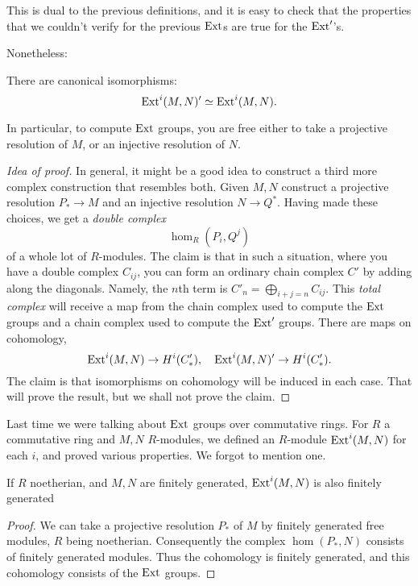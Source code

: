 This is dual to the previous definitions, and it is easy to
check that the
properties that we couldn't verify for the previous $\mathrm{Ext}$s are
true for the
$\mathrm{Ext}'$'s. 

Nonetheless:

\begin{theorem} 
There are canonical isomorphisms:
\[ \mathrm{Ext}^i(M,N)' \simeq \mathrm{Ext}^i(M,N).  \]
\end{theorem} 

In particular, to compute $\mathrm{Ext}$ groups, you are free either to
take a
projective resolution of $M$, or an injective resolution of $N$.
\begin{proof}[Idea of proof]
In general, it might be a good idea to construct a third more
complex
construction that resembles both. Given $M,N$ construct a
projective resolution
$P_* \to M$ and an injective resolution $N \to Q^*$. Having made
these choices,
we get a \emph{double complex}
\[ \hom_R(P_i, Q^j)  \]
of a whole lot of $R$-modules. The claim is that in such a
situation, where
you have a double complex $C_{ij}$, you can
form an ordinary chain complex $C'$
by adding along the diagonals. Namely, the $n$th term 
is $C'_n = \bigoplus_{i+j=n} C_{ij}$. This \emph{total complex}
will receive a
map from the chain complex used to compute the $\mathrm{Ext}$ groups and
a chain
complex used to compute the $\mathrm{Ext}'$ groups. There are maps on
cohomology,
\[ \mathrm{Ext}^i(M,N) \to H^i(C'_*), \quad \mathrm{Ext}^i(M,N)' \to H^i(C'_*).
\]
The claim is that isomorphisms on
cohomology will be induced in each case. That will prove the
result, but we
shall not prove the claim.
\end{proof} 

Last time we were talking about $\mathrm{Ext}$ groups over commutative
rings. For $R$ a
commutative ring and $M,N$ $R$-modules, we defined an $R$-module
$\mathrm{Ext}^i(M,N)$ for
each $i$, and proved various properties. We forgot to mention
one.

\begin{proposition} 
If $R$ noetherian, and $M,N$ are finitely generated,
$\mathrm{Ext}^i(M,N)$ is also finitely generated
\end{proposition} 
\begin{proof} 
We can take a projective resolution $P_*$ of $M$ by finitely
generated free modules, $R$ being
noetherian. Consequently the complex $\hom(P_*, N)$ consists of
finitely
generated modules. Thus the cohomology is finitely generated,
and this cohomology
consists of the $\mathrm{Ext}$ groups.
\end{proof} 


